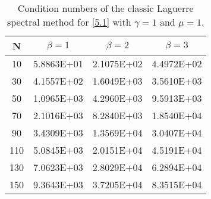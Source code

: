 \documentclass[10pt,reqno]{amsart}
\theoremstyle{remark}
\theoremstyle{definition}
\begin{document}
\begin{center}
\begin{table}[h]\begin{minipage}{0.5\linewidth}
\begin{tabular}{|c|c|c|c|}
\hline
N&$\beta=1$&$\beta=2$&$\beta=3$\\
\hline
10&5.8863E+01&2.1075E+02&4.4972E+02\\
30&4.1557E+02&1.6049E+03&3.5610E+03\\
50&1.0965E+03&4.2960E+03&9.5913E+03\\
70&2.1016E+03&8.2840E+03&1.8540E+04\\
90&3.4309E+03&1.3569E+04&3.0407E+04\\
110&5.0845E+03&2.0151E+04&4.5191E+04\\
130&7.0623E+03&2.8029E+04&6.2894E+04\\
150&9.3643E+03&3.7205E+04&8.3515E+04\\
\hline
\end{tabular}
\caption{Condition numbers of the classic Laguerre spectral method
for \eqref{5.1} with $\gamma=1$ and $\mu=1$.}\label{Tab3.2}\end{minipage}
\end{table}
\end{center}
\end{document}
